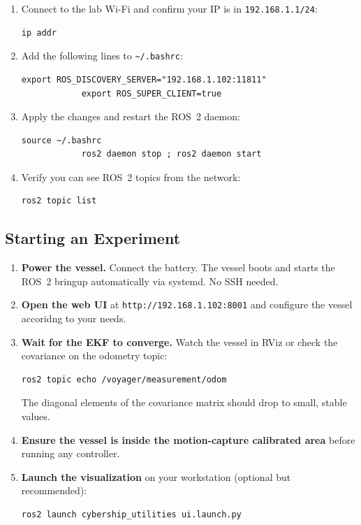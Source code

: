 \documentclass[12pt,a4paper]{article}
\begin{document}
	\begin{enumerate}
		\item Connect to the lab Wi-Fi and confirm your IP is in \texttt{192.168.1.1/24}:
		\begin{lstlisting}[style=bash]
			ip addr
		\end{lstlisting}
		\item Add the following lines to \texttt{\textasciitilde/.bashrc}:
		\begin{lstlisting}[style=bash]
			export ROS_DISCOVERY_SERVER="192.168.1.102:11811"
			export ROS_SUPER_CLIENT=true
		\end{lstlisting}
		\item Apply the changes and restart the ROS~2 daemon:
		\begin{lstlisting}[style=bash]
			source ~/.bashrc
			ros2 daemon stop ; ros2 daemon start
		\end{lstlisting}
		\item Verify you can see ROS~2 topics from the network:
		\begin{lstlisting}[style=bash]
			ros2 topic list
		\end{lstlisting}
	\end{enumerate}
	
	\subsection{Starting an Experiment}
	\label{ssec:start-experiment}
	
	\begin{enumerate}
		\item \textbf{Power the vessel.} Connect the battery. The vessel boots and starts the ROS~2
		bringup automatically via systemd. No SSH needed.
		\item \textbf{Open the web UI} at \texttt{http://192.168.1.102:8001} and
		configure the vessel accoridng to your needs.
		\item \textbf{Wait for the EKF to converge.} Watch the vessel in RViz or check the
		covariance on the odometry topic:
		\begin{lstlisting}[style=bash]
			ros2 topic echo /voyager/measurement/odom
		\end{lstlisting}
		The diagonal elements of the covariance matrix should drop to small, stable values.
		\item \textbf{Ensure the vessel is inside the motion-capture calibrated area} before
		running any controller.
		\item \textbf{Launch the visualization} on your workstation (optional but recommended):
		\begin{lstlisting}[style=bash]
			ros2 launch cybership_utilities ui.launch.py
		\end{lstlisting}
	\end{enumerate}
	
\end{document}
